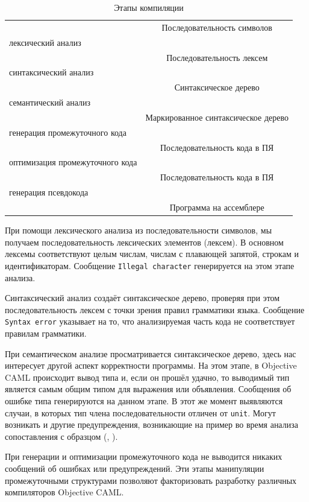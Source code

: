 \begin{table}
	\begin{tabular}{lc}
	 & Последовательность символов \\
	лексический анализ & \\
	 & Последовательность лексем \\
	синтаксический анализ & \\
	 & Синтаксическое дерево \\
	семантический анализ & \\
	 & Маркированное синтаксическое дерево \\
	генерация промежуточного кода & \\
	 & Последовательность кода в ПЯ \\
	оптимизация промежуточного кода & \\
	& Последовательность кода в ПЯ \\
	генерация псевдокода & \\
	 & Программа на ассемблере\\
	\end{tabular}
	\caption{\label{tbl:compilation_stages}Этапы компиляции}
\end{table}

При помощи лексического анализа из последовательности символов, мы получаем
последовательность лексических элементов (лексем). В основном лексемы
соответствуют целым числам, числам с плавающей запятой, строкам и
идентификаторам. Сообщение \texttt{Illegal character} генерируется на этом
этапе анализа.

Синтаксический анализ создаёт синтаксическое дерево, проверяя при этом
последовательность лексем с точки зрения правил грамматики языка. Сообщение
\texttt{Syntax error} указывает на то, что анализируемая часть кода не
соответствует правилам грамматики.

При семантическом анализе просматривается синтаксическое дерево, здесь нас
интересует другой аспект корректности программы. На этом этапе, в Objective CAML
происходит вывод типа и, если он прошёл удачно, то выводимый тип является самым
общим типом для выражения или объявления. Сообщения об ошибке типа генерируются
на данном этапе. В этот же момент выявляются случаи, в которых тип члена
последовательности отличен от \texttt{unit}. Могут возникать и другие
предупреждения, возникающие на пример во время анализа сопоставления с образцом
(, ).

При генерации и оптимизации промежуточного кода не выводится никаких сообщений
об ошибках или предупреждений. Эти этапы манипуляции промежуточными структурами
позволяют факторизовать разработку различных компиляторов Objective CAML.

